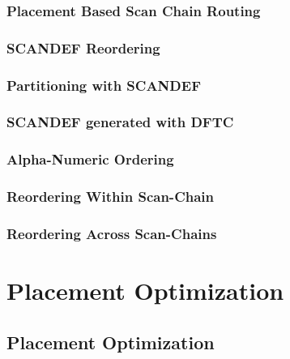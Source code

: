 \documentclass[compress]{beamer}
\begin{document}
\begin{frame}
	\frametitle{Placement Based Scan Chain Routing}
	\begin{center}
	\end{center}
\end{frame}
\begin{frame}
	\frametitle{SCANDEF Reordering}
		\begin{center}
	\end{center}
\end{frame}

\begin{frame}
	\frametitle{Partitioning with SCANDEF}
	\begin{center}
	\end{center}
\end{frame}

\begin{frame}
	\frametitle{SCANDEF generated with DFTC}
	\begin{center}
	\end{center}
\end{frame}

\begin{frame}
	\frametitle{Alpha-Numeric Ordering}
	\begin{center}
	\end{center}
\end{frame}

\begin{frame}
	\frametitle{Reordering Within Scan-Chain}
	\begin{center}
	\end{center}
\end{frame}
\begin{frame}
	\frametitle{Reordering Across Scan-Chains}
	\begin{center}
	\end{center}
\end{frame}


\section[Optimization]{Placement Optimization}
\subsection[Optimization]{Placement Optimization}
\end{document}
